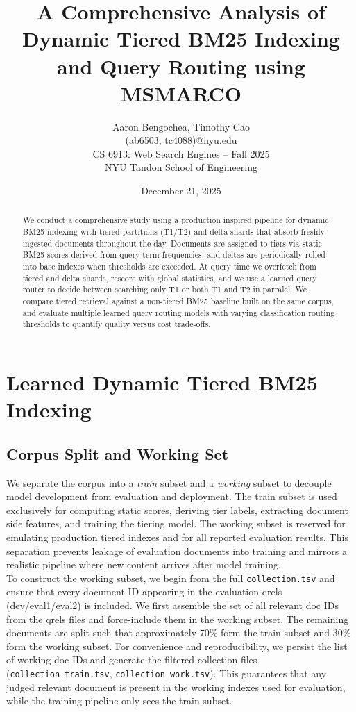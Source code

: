 \documentclass[11pt]{article}
\title{A Comprehensive Analysis of Dynamic Tiered BM25 Indexing and Query Routing using MSMARCO}
\author{Aaron Bengochea, Timothy Cao\\
(ab6503, tc4088)@nyu.edu\\
CS 6913: Web Search Engines -- Fall 2025 \\
NYU Tandon School of Engineering}\\
\date{December 21, 2025}
\begin{document}
\maketitle

\begin{abstract}
We conduct a comprehensive study using a production inspired pipeline for dynamic BM25 indexing with tiered partitions (T1/T2) and delta shards that absorb freshly ingested documents throughout the day. Documents are assigned to tiers via static BM25 scores derived from query-term frequencies, and deltas are periodically rolled into base indexes when thresholds are exceeded. At query time we overfetch from tiered and delta shards, rescore with global statistics, and we use a learned query router to decide between searching only T1 or both T1 and T2 in parralel. We compare tiered retrieval against a non-tiered BM25 baseline built on the same corpus, and evaluate multiple learned query routing models with varying classification routing thresholds to quantify quality versus cost trade-offs.
\end{abstract}

\section{Learned Dynamic Tiered BM25 Indexing}
\subsection{Corpus Split and Working Set}
We separate the corpus into a \emph{train} subset and a \emph{working} subset to decouple model development from evaluation and deployment. The train subset is used exclusively for computing static scores, deriving tier labels, extracting document side features, and training the tiering model. The working subset is reserved for emulating production tiered indexes and for all reported evaluation results. This separation prevents leakage of evaluation documents into training and mirrors a realistic pipeline where new content arrives after model training. \\

To construct the working subset, we begin from the full \texttt{collection.tsv} and ensure that every document ID appearing in the evaluation qrels (dev/eval1/eval2) is included. We first assemble the set of all relevant doc IDs from the qrels files and force-include them in the working subset. The remaining documents are split such that approximately 70\% form the train subset and 30\% form the working subset. For convenience and reproducibility, we persist the list of working doc IDs  and generate the filtered collection files (\texttt{collection\_train.tsv}, \texttt{collection\_work.tsv}). This guarantees that any judged relevant document is present in the working indexes used for evaluation, while the training pipeline only sees the train subset. \\
\end{document}
